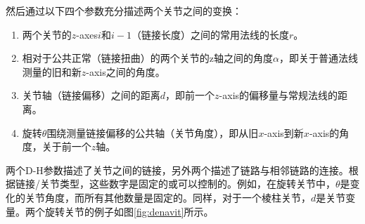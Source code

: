 
然后通过以下四个参数充分描述两个关节之间的变换：


\begin{enumerate}
\item 两个关节的$z$-axes$i$和$i-1$（链接长度）之间的常用法线的长度$r$。
\item 相对于公共正常（链接扭曲）的两个关节的z轴之间的角度$\alpha$，即关于普通法线测量的旧和新$z$-axis之间的角度。
\item 关节轴（链接偏移）之间的距离$d$，即前一个$z$-axis的偏移量与常规法线的距离。
\item 旋转$\theta$围绕测量链接偏移的公共轴（关节角度），即从旧$x$-axis到新$x$-axis的角度，关于前一个$z$轴。
\end{enumerate}


两个D-H参数描述了关节之间的链接，另外两个描述了链路与相邻链路的连接。根据链接/关节类型，这些数字是固定的或可以控制的。例如，在旋转关节中，$\theta$是变化的关节角度，而所有其他数量是固定的。同样，对于一个棱柱关节，$d$是关节变量。两个旋转关节的例子如图\ref{fig:denavit}所示。

